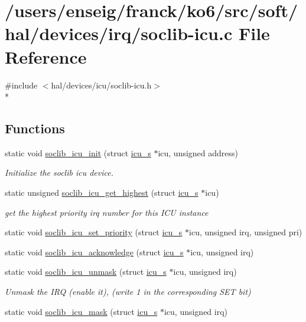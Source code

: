 \hypertarget{irq_2soclib-icu_8c}{\section{/users/enseig/franck/ko6/src/soft/hal/devices/irq/soclib-\/icu.c File Reference}
\label{irq_2soclib-icu_8c}
}
{\ttfamily \#include $<$hal/devices/icu/soclib-\/icu.\-h$>$}\\*
\subsection*{Functions}
\begin{DoxyCompactItemize}
\item 
static void \hyperlink{irq_2soclib-icu_8c_a291831fe78dd1a558504a84a5685199b}{soclib\-\_\-icu\-\_\-init} (struct \hyperlink{structicu__s}{icu\-\_\-s} $\ast$icu, unsigned address)
\begin{DoxyCompactList}\small\item\em Initialize the soclib icu device. \end{DoxyCompactList}\item 
static unsigned \hyperlink{irq_2soclib-icu_8c_a31bf159c6e02e1717177273e6a74d374}{soclib\-\_\-icu\-\_\-get\-\_\-highest} (struct \hyperlink{structicu__s}{icu\-\_\-s} $\ast$icu)
\begin{DoxyCompactList}\small\item\em get the highest priority irq number for this I\-C\-U instance \end{DoxyCompactList}\item 
static void \hyperlink{irq_2soclib-icu_8c_a29d2109ae12995fb60a2a9f278281e4f}{soclib\-\_\-icu\-\_\-set\-\_\-priority} (struct \hyperlink{structicu__s}{icu\-\_\-s} $\ast$icu, unsigned irq, unsigned pri)
\item 
static void \hyperlink{irq_2soclib-icu_8c_a924a53d9cd3a4685a608fe6ec5efdca8}{soclib\-\_\-icu\-\_\-acknowledge} (struct \hyperlink{structicu__s}{icu\-\_\-s} $\ast$icu, unsigned irq)
\item 
static void \hyperlink{irq_2soclib-icu_8c_a7fcbcc6fb620f7a6ed3082b7053ce0e1}{soclib\-\_\-icu\-\_\-unmask} (struct \hyperlink{structicu__s}{icu\-\_\-s} $\ast$icu, unsigned irq)
\begin{DoxyCompactList}\small\item\em Unmask the I\-R\-Q (enable it), (write 1 in the corresponding S\-E\-T bit) \end{DoxyCompactList}\item 
static void \hyperlink{irq_2soclib-icu_8c_a97854aad88a8ec5625b03d30cc0246e4}{soclib\-\_\-icu\-\_\-mask} (struct \hyperlink{structicu__s}{icu\-\_\-s} $\ast$icu, unsigned irq)
\end{DoxyCompactItemize}

